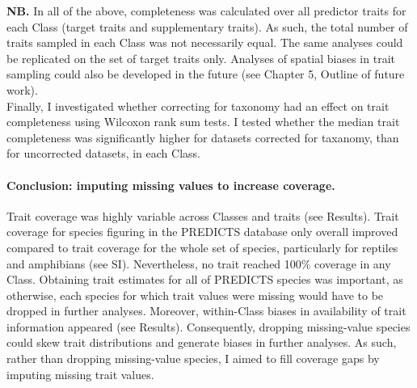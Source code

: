 \textbf{NB.} In all of the above, completeness was calculated over all predictor traits for each Class (target traits and supplementary traits). As such, the total number of traits sampled in each Class was not necessarily equal. The same analyses could be replicated on the set of target traits only. Analyses of spatial biases in trait sampling could also be developed in the future (see Chapter 5, Outline of future work).\\

Finally, I investigated whether correcting for taxonomy had an effect on trait completeness using Wilcoxon rank sum tests. I tested whether the median trait completeness was significantly higher for datasets corrected for taxanomy, than for uncorrected datasets, in each Class.

\paragraph{Conclusion: imputing missing values to increase coverage.}
Trait coverage was highly variable across Classes and traits (see Results). Trait coverage for species figuring in the PREDICTS database only overall improved compared to trait coverage for the whole set of species, particularly for reptiles and amphibians (see SI). Nevertheless, no trait reached 100\% coverage in any Class. Obtaining trait estimates for all of PREDICTS species was important, as otherwise, each species for which trait values were missing would have to be dropped in further analyses. Moreover, within-Class biases in availability of trait information appeared (see Results). Consequently, dropping missing-value species could skew trait distributions and generate biases in further analyses. As such, rather than dropping missing-value species, I aimed to fill coverage gaps by imputing missing trait values. 

